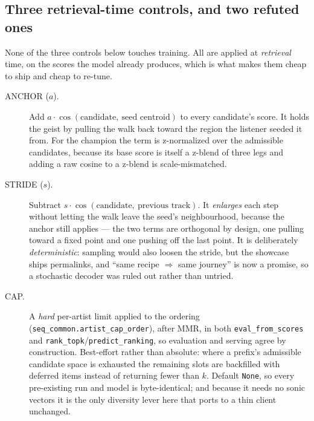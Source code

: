 \documentclass[11pt]{article}
\begin{document}
\subsection{Three retrieval-time controls, and two refuted ones}
\label{sec:walk-controls}
None of the three controls below touches training. All are applied at
\emph{retrieval} time, on the scores the model already produces, which is what
makes them cheap to ship and cheap to re-tune.

\begin{description}
  \item[ANCHOR ($a$).] Add $a\cdot\cos(\text{candidate},\ \text{seed centroid})$
  to every candidate's score. It holds the geist by pulling the walk back toward
  the region the listener seeded it from. For the champion the term is
  z-normalized over the admissible candidates, because its base score is itself a
  z-blend of three legs and adding a raw cosine to a z-blend is scale-mismatched.
  \item[STRIDE ($s$).] Subtract $s\cdot\cos(\text{candidate},\ \text{previous
  track})$. It \emph{enlarges} each step without letting the walk leave the
  seed's neighbourhood, because the anchor still applies --- the two terms are
  orthogonal by design, one pulling toward a fixed point and one pushing off the
  last point. It is deliberately \emph{deterministic}: sampling would also loosen
  the stride, but the showcase ships permalinks, and ``same recipe $\Rightarrow$
  same journey'' is now a promise, so a stochastic decoder was ruled out rather
  than untried.
  \item[CAP.] A \emph{hard} per-artist limit applied to the ordering
  (\texttt{seq\_common.artist\_cap\_order}), after MMR, in both
  \texttt{eval\_from\_scores} and \texttt{rank\_topk}/\texttt{predict\_ranking},
  so evaluation and serving agree by construction. Best-effort rather than
  absolute: where a prefix's admissible candidate space is exhausted the
  remaining slots are backfilled with deferred items instead of returning fewer
  than $k$. Default \texttt{None}, so every pre-existing run and model is
  byte-identical; and because it needs no sonic vectors it is the only diversity
  lever here that ports to a thin client unchanged.
\end{description}
\end{document}
